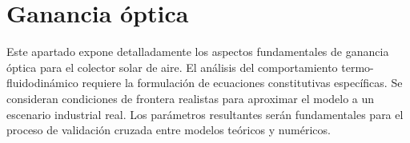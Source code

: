 \section{Ganancia óptica}
\label{sec:cap06_optica}

Este apartado expone detalladamente los aspectos fundamentales de ganancia óptica para el colector solar de aire.
El análisis del comportamiento termo-fluidodinámico requiere la formulación de ecuaciones constitutivas específicas.
Se consideran condiciones de frontera realistas para aproximar el modelo a un escenario industrial real.
Los parámetros resultantes serán fundamentales para el proceso de validación cruzada entre modelos teóricos y numéricos.
